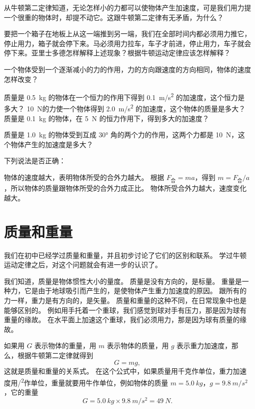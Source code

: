 \begin{Practice}
\begin{question}
	\item 从牛顿第二定律知道，无论怎样小的力都可以使物体产生加速度，可是我们用力提一个很重的物体时，却提不动它。这跟牛顿第二定律有无矛盾，为什么？
  \item 要把一个箱子在地板上从这一端推到另一端，我们在全部时间内都必须用力推它，停止用力，箱子就会停下来。马必须用力拉车，车子才前进，停止用力，车子就会停下来。亚里士多德怎样解释上述现象？根据牛顿运动定律应该怎样解释？
  \item 一个物体受到一个逐渐减小的力的作用，力的方向跟速度的方向相同，物体的速度怎样改变？
  \item 
    \begin{tasks}[before-skip=5pt]
      \task 质量是 \qty{0.5}{kg} 的物体在一个恒力的作用下得到 \qty{0.1}{m/s^2} 的加速度，这个恒力是多大？
      \task \qty{10}{N}的力使一个物体得到 \qty{2.0}{m/s^2} 的加速度，这个物体的质量是多大？
      \task 质量是 \qty{0.1}{kg} 的物体，在 \qty{5}{N} 的恒力作用下，得到多大的加速度？
    \end{tasks}
  \item 质量是 \qty{1.0}{kg} 的物体受到互成 \ang{30} 角的两个力的作用，这两个力都是 \qty{10}{N}，这个物体产生的加速度是多大？
  \item 下列说法是否正确：
  \begin{tasks}
    \task 物体的速度越大，表明物体所受的合外力越大。
    \task 根据 $F_{\text{合}}=ma$，得到 $m=F_{\text{合}}/a$，所以物体的质量跟物体所受的合外力成正比。
    \task 物体所受合外力越大，速度变化越大。
  \end{tasks}
\end{question}
\end{Practice}

\section{质量和重量}
我们在初中已经学过质量和重量，并且初步讨论了它们的区别和联系。
学过牛顿运动定律之后，对这个问题就会有进一步的认识了。

我们知道，质量是物体惯性大小的量度。
质量是没有方向的，是标量。
重量是一种力，它是由于地球吸引而产生的，是使物体产生重力加速度的原因。
跟所有的力一样，重力是有方向的，是矢量。
质量和重量的这种不同，在日常现象中也是能够区别的。
例如用手托着一个重球，我们感觉到球对手有压力，那是因为球有重量的缘故。
在水平面上加速这个重球，我们必须用力，那是因为球有质量的缘故。

如果用 $G$ 表示物体的重量，用 $m$ 表示物体的质量，用 $g$ 表示重力加速度，那么，根据牛顿第二定律就得到
\[ G=mg,\]
这就是质量和重量的关系式。
在这个公式中，如果质量用千克作单位，重力加速度用\unit{/^2}作单位，重量就要用牛作单位，例如物体的质量 $m=\qty{5.0}{kg}$，$g=\qty{9.8}{m/s^2}$，它的重量
\[G=\qty{5.0}{kg}\times \qty{9.8}{m/s^2} =\qty{49}{N}.\]

